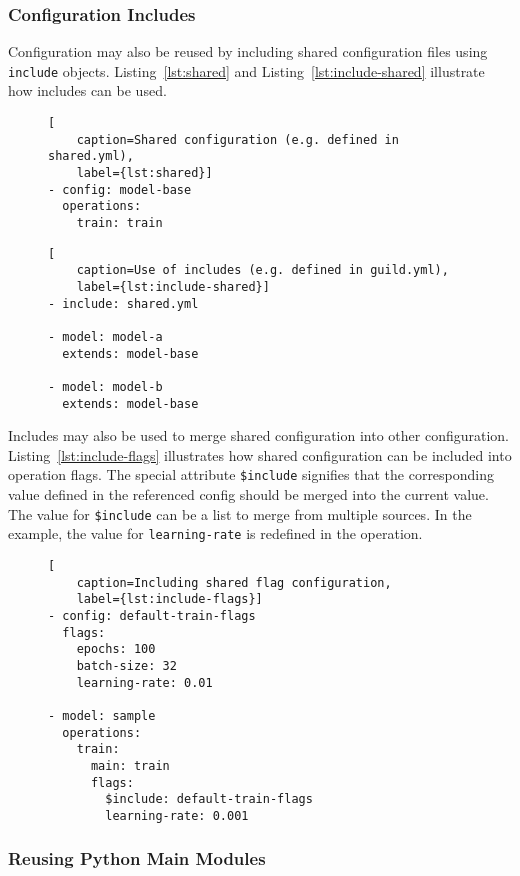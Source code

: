 \documentclass{article}
\begin{document}
\subsubsection{Configuration Includes}

Configuration may also be reused by including shared configuration
files using \verb|include| objects. Listing~\ref{lst:shared} and
Listing~\ref{lst:include-shared} illustrate how includes can be used.

\begin{figure}
\begin{lstlisting}[
    caption=Shared configuration (e.g. defined in shared.yml),
    label={lst:shared}]
- config: model-base
  operations:
    train: train
\end{lstlisting}
\end{figure}

\begin{figure}
\begin{lstlisting}[
    caption=Use of includes (e.g. defined in guild.yml),
    label={lst:include-shared}]
- include: shared.yml

- model: model-a
  extends: model-base

- model: model-b
  extends: model-base
\end{lstlisting}
\end{figure}

Includes may also be used to merge shared configuration into other
configuration. Listing~\ref{lst:include-flags} illustrates how shared
configuration can be included into operation flags. The special
attribute \verb|$include| signifies that the corresponding value
defined in the referenced config should be merged into the current
value. The value for \verb|$include| can be a list to merge from
multiple sources. In the example, the value for \verb|learning-rate|
is redefined in the operation.

\begin{figure}
\begin{lstlisting}[
    caption=Including shared flag configuration,
    label={lst:include-flags}]
- config: default-train-flags
  flags:
    epochs: 100
    batch-size: 32
    learning-rate: 0.01

- model: sample
  operations:
    train:
      main: train
      flags:
        $include: default-train-flags
        learning-rate: 0.001
\end{lstlisting}
\end{figure}

\subsubsection{Reusing Python Main Modules}
\end{document}
